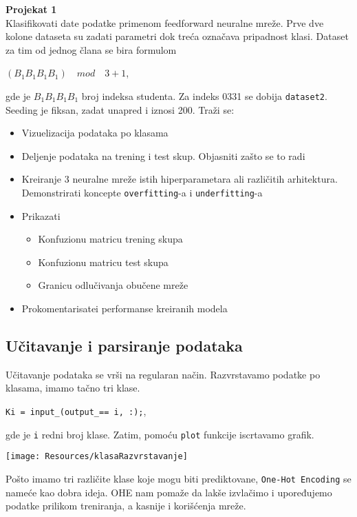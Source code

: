 \documentclass{article}
\providecommand{\inlinecode}[1]{\texttt{#1}}
\newenvironment{problem}[2][Projekat]
    { \begin{mdframed}[backgroundcolor=gray!20] \textbf{#1 #2} \\}
    {  \end{mdframed}}
\newenvironment{solution}[2][]
    { \begin{mdframed}[backgroundcolor=gray!0] \textbf{#1 #2}}
    {  \end{mdframed}}
\begin{document}
    \begin{problem}{1}
    Klasifikovati date podatke primenom feedforward neuralne mreže. Prve dve kolone dataseta su zadati parametri dok treća označava pripadnost klasi. Dataset za tim od jednog člana se bira formulom \begin{center}
        $(B_1B_1B_1B_1)  \quad mod \quad 3 + 1$,
    \end{center}
    gde je $B_1B_1B_1B_1$ broj indeksa studenta. Za indeks 0331 se dobija \inlinecode{dataset2}. Seeding je fiksan, zadat unapred i iznosi 200. Traži se:
    \begin{itemize}
        \item Vizuelizacija podataka po klasama
        \item Deljenje podataka na trening i test skup. Objasniti zašto se to radi
        \item Kreiranje 3 neuralne mreže istih hiperparametara ali različitih arhitektura. Demonstrirati koncepte \inlinecode{overfitting}-a i \inlinecode{underfitting}-a
        \item Prikazati
        \begin{itemize}
            \item Konfuzionu matricu trening skupa
            \item Konfuzionu matricu test skupa
            \item Granicu odlučivanja obučene mreže
        \end{itemize}
        \item Prokomentarisatei performanse kreiranih modela
    \end{itemize}
    
    \end{problem}
    
    \begin{solution}{}
    
        
    \subsection*{Učitavanje i parsiranje podataka}
    Učitavanje podataka se vrši na regularan način. Razvrstavamo podatke po klasama, imamo tačno tri klase.
    \begin{center}
        \inlinecode{Ki = input\_(output\_== i,  :);},

    \end{center}
    gde je \inlinecode{i} redni broj klase. Zatim, pomoću \inlinecode{plot} funkcije iscrtavamo grafik.
    \begin{center}
        \texttt{[image: Resources/klasaRazvrstavanje]}

    \end{center}
    
    Pošto imamo tri različite klase koje mogu biti prediktovane, \inlinecode{One-Hot Encoding} se nameće kao dobra ideja. OHE nam pomaže da lakše izvlačimo i upoređujemo podatke prilikom treniranja, a kasnije i korišćenja mreže. 
        \end{solution}
\end{document}
